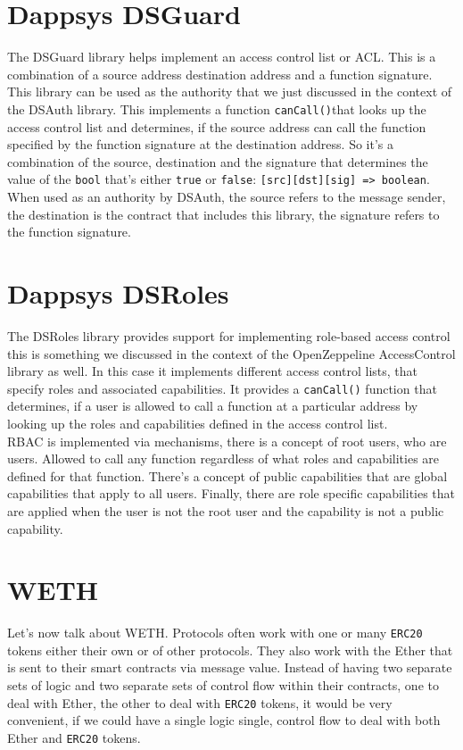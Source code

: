 \section{Dappsys DSGuard}
The DSGuard library helps implement an access control list or ACL. This is a combination of a source address destination address and a function signature.\\

This library can be used as the authority that we just discussed in the context of the DSAuth library. This implements a function \verb|canCall()|that looks up the access control list and determines, if the source address can call the function specified by the function signature at the destination address.  So it's a combination of the source, destination and the signature that determines the value of the \verb|bool| that's either \verb|true| or \verb|false|: \verb|[src][dst][sig] => boolean|.\\

When used as an authority by DSAuth, the source refers to the message sender, the destination is the contract that includes this library, the signature refers to the function signature.

\section{Dappsys DSRoles}
The DSRoles library provides support for implementing role-based access control this is something we discussed in the context of the OpenZeppeline AccessControl library as well. In this case it implements different access control lists, that specify roles and associated capabilities. It provides a \verb|canCall()| function that determines, if a user is allowed to call a function at a particular address by looking up the roles and capabilities defined in the access control list.\\

RBAC is implemented via mechanisms, there is a concept of root users, who are users. Allowed to call any function regardless of what roles and capabilities are defined for that function. There's a concept of public capabilities that are global capabilities that apply to all users. Finally, there are role specific capabilities that are applied when the user is not the root user and the capability is not a public capability.

\section{WETH}
Let's now talk about WETH. Protocols often work with one or many \verb|ERC20| tokens either their own or of other protocols. They also work with the Ether that is sent to their smart contracts via message value. Instead of having two separate sets of logic and two separate sets of control flow within their contracts, one to deal with Ether, the other to deal with \verb|ERC20| tokens, it would be very convenient, if we could have a single logic single, control flow to deal with both Ether and \verb|ERC20| tokens.\\


